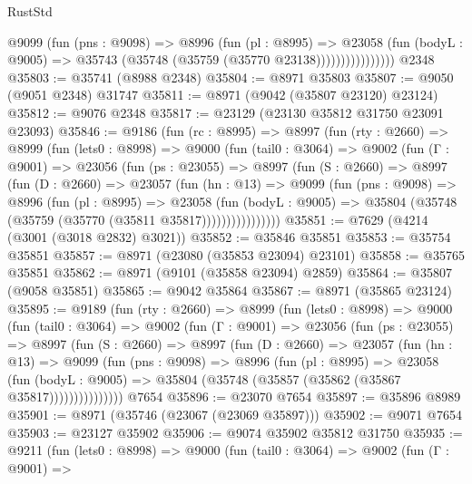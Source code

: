 \begin{lexlean}{RustStd}
\begin{coremodule}
                      @9099
                        (fun (pns : @9098) =>
                        @8996
                          (fun (pl : @8995) =>
                          @23058
                            (fun (bodyL : @9005) =>
                            @35743 (@35748 (@35759 (@35770 @23138))))))))))))))))
    @2348
@35803 := @35741 (@8988 @2348)
@35804 := @8971 @35803
@35807 := @9050 (@9051 @2348) @31747
@35811 := @8971 (@9042 (@35807 @23120) @23124)
@35812 := @9076 @2348
@35817 := @23129 (@23130 @35812 @31750 @23091 @23093)
@35846 := @9186
    (fun (rc : @8995) =>
    @8997
      (fun (rty : @2660) =>
      @8999
        (fun (lets0 : @8998) =>
        @9000
          (fun (tail0 : @3064) =>
          @9002
            (fun (Γ : @9001) =>
            @23056
              (fun (ps : @23055) =>
              @8997
                (fun (S : @2660) =>
                @8997
                  (fun (D : @2660) =>
                  @23057
                    (fun (hn : @13) =>
                    @9099
                      (fun (pns : @9098) =>
                      @8996
                        (fun (pl : @8995) =>
                        @23058
                          (fun (bodyL : @9005) =>
                          @35804 (@35748 (@35759 (@35770 (@35811 @35817))))))))))))))))
@35851 := @7629 (@4214 (@3001 (@3018 @2832) @3021))
@35852 := @35846 @35851
@35853 := @35754 @35851
@35857 := @8971 (@23080 (@35853 @23094) @23101)
@35858 := @35765 @35851
@35862 := @8971 (@9101 (@35858 @23094) @2859)
@35864 := @35807 (@9058 @35851)
@35865 := @9042 @35864
@35867 := @8971 (@35865 @23124)
@35895 := @9189
    (fun (rty : @2660) =>
    @8999
      (fun (lets0 : @8998) =>
      @9000
        (fun (tail0 : @3064) =>
        @9002
          (fun (Γ : @9001) =>
          @23056
            (fun (ps : @23055) =>
            @8997
              (fun (S : @2660) =>
              @8997
                (fun (D : @2660) =>
                @23057
                  (fun (hn : @13) =>
                  @9099
                    (fun (pns : @9098) =>
                    @8996
                      (fun (pl : @8995) =>
                      @23058
                        (fun (bodyL : @9005) =>
                        @35804 (@35748 (@35857 (@35862 (@35867 @35817)))))))))))))))
    @7654
@35896 := @23070 @7654
@35897 := @35896 @8989
@35901 := @8971 (@35746 (@23067 (@23069 @35897)))
@35902 := @9071 @7654
@35903 := @23127 @35902
@35906 := @9074 @35902 @35812 @31750
@35935 := @9211
    (fun (lets0 : @8998) =>
    @9000
      (fun (tail0 : @3064) =>
      @9002
        (fun (Γ : @9001) =>

\end{coremodule}
\end{lexlean}
